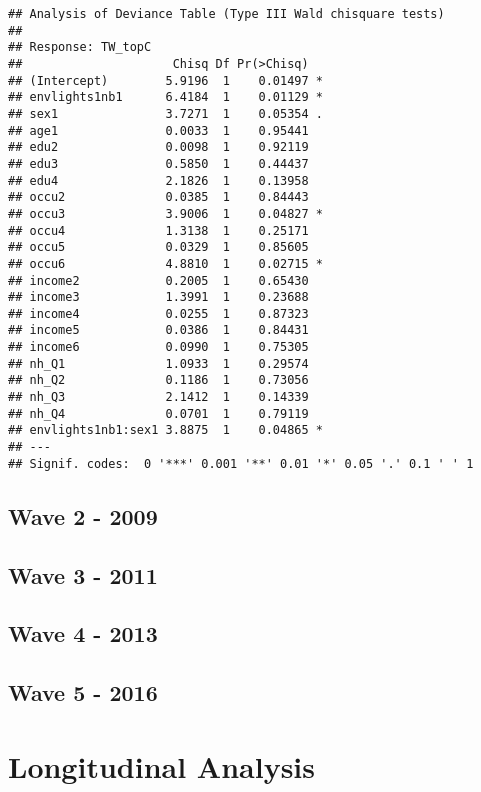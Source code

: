 \documentclass[
]{book}
\begin{document}
\begin{verbatim}
## Analysis of Deviance Table (Type III Wald chisquare tests)
## 
## Response: TW_topC
##                     Chisq Df Pr(>Chisq)  
## (Intercept)        5.9196  1    0.01497 *
## envlights1nb1      6.4184  1    0.01129 *
## sex1               3.7271  1    0.05354 .
## age1               0.0033  1    0.95441  
## edu2               0.0098  1    0.92119  
## edu3               0.5850  1    0.44437  
## edu4               2.1826  1    0.13958  
## occu2              0.0385  1    0.84443  
## occu3              3.9006  1    0.04827 *
## occu4              1.3138  1    0.25171  
## occu5              0.0329  1    0.85605  
## occu6              4.8810  1    0.02715 *
## income2            0.2005  1    0.65430  
## income3            1.3991  1    0.23688  
## income4            0.0255  1    0.87323  
## income5            0.0386  1    0.84431  
## income6            0.0990  1    0.75305  
## nh_Q1              1.0933  1    0.29574  
## nh_Q2              0.1186  1    0.73056  
## nh_Q3              2.1412  1    0.14339  
## nh_Q4              0.0701  1    0.79119  
## envlights1nb1:sex1 3.8875  1    0.04865 *
## ---
## Signif. codes:  0 '***' 0.001 '**' 0.01 '*' 0.05 '.' 0.1 ' ' 1
\end{verbatim}

\hypertarget{wave-2---2009}{%
\section{Wave 2 - 2009}\label{wave-2---2009}}

\hypertarget{wave-3---2011}{%
\section{Wave 3 - 2011}\label{wave-3---2011}}

\hypertarget{wave-4---2013}{%
\section{Wave 4 - 2013}\label{wave-4---2013}}

\hypertarget{wave-5---2016}{%
\section{Wave 5 - 2016}\label{wave-5---2016}}

\hypertarget{longitudinal-analysis}{%
\chapter{Longitudinal Analysis}\label{longitudinal-analysis}}

  
\end{document}
